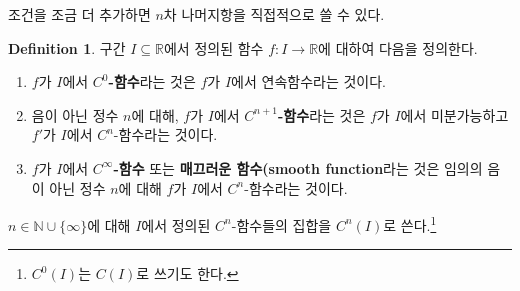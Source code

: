 \documentclass[11pt]{book}
\numberwithin{equation}{chapter}
\def\NN{\mathbb{N}}
\def\RR{\mathbb{R}}
\theoremstyle{definition}
\newtheorem{defn}[thm]{Definition}
\newenvironment{enum}
	{\begin{enumerate}[label=(\alph*), leftmargin=2\parindent]}
	{\end{enumerate}}
\begin{document}
조건을 조금 더 추가하면 \(n\)차 나머지항을 직접적으로 쓸 수 있다.

\begin{defn} \label{8.3.4}
    구간 \(I \subseteq \RR\)에서 정의된 함수 \(f : I \to \RR\)에 대하여 다음을 정의한다.
    \begin{enum}
        \item \(f\)가 \(I\)에서 \textbf{\(C^0\)-함수}라는 것은 \(f\)가 \(I\)에서 연속함수라는 것이다.
        \item 음이 아닌 정수 \(n\)에 대해, \(f\)가 \(I\)에서 \textbf{\(C^{n+1}\)-함수}라는 것은 \(f\)가 \(I\)에서 미분가능하고 \(f'\)가 \(I\)에서 \(C^n\)-함수라는 것이다.
        \item \(f\)가 \(I\)에서 \textbf{\(C^\infty\)-함수} 또는 \textbf{매끄러운 함수(smooth function}라는 것은 임의의 음이 아닌 정수 \(n\)에 대해 \(f\)가 \(I\)에서 \(C^n\)-함수라는 것이다.
    \end{enum}
    \(n \in \NN \cup \{\infty\}\)에 대해 \(I\)에서 정의된 \(C^n\)-함수들의 집합을 \(C^n(I)\)로 쓴다.\footnote{\(C^0(I)\)는 \(C(I)\)로 쓰기도 한다.}
\end{defn}
\end{document}
